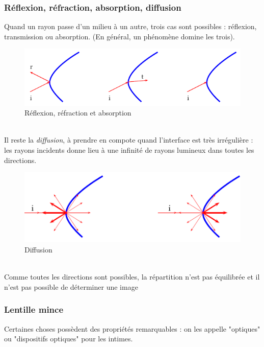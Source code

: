 \documentclass	[11pt, a4paper, openany]{book}
\begin{document}
		\subsubsection*{Réflexion, réfraction, absorption, diffusion}
		Quand un rayon passe d'un milieu à un autre, trois cas sont possibles : réflexion, transmission ou absorption. (En général, un phénomène domine les trois).\\
		\begin{figure}[h]
			\begin{center}
				\includegraphics[scale=0.5]{labo/image26.png}
			\end{center}
			\caption{Réflexion, réfraction et absorption}
			\label{rra}
		\end{figure}\ \\
		Il reste la \textit{diffusion}, à prendre en compote quand l'interface est très irrégulière : les rayons incidents donne lieu à une infinité de rayons lumineux dans toutes les directions.\\
		\begin{figure}[h]
			\begin{center}
				\includegraphics[scale=0.5]{labo/image27.png}
			\end{center}
			\caption{Diffusion}
			\label{diff}
		\end{figure}\ \\
		Comme toutes les directions sont possibles, la répartition n'est pas équilibrée et il n'est pas possible de déterminer une image
		
		\subsubsection*{Lentille mince}
		Certaines choses possèdent des propriétés remarquables : on les appelle "optiques" ou "dispositifs optiques" pour les intimes.\\
		
\end{document}
